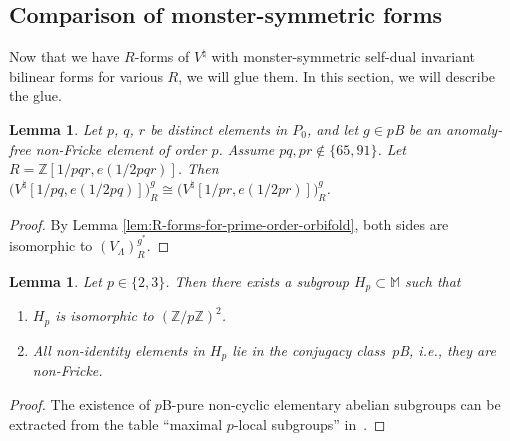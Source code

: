 \documentclass[11pt]{article}
\newcommand{\bM}{\mathbb{M}}
\newcommand{\bZ}{\mathbb{Z}}
\newtheorem{lem}[thm]{Lemma}
\theoremstyle{definition}
\begin{document}
\subsection{Comparison of monster-symmetric forms}

Now that we have $R$-forms of $V^\natural$ with monster-symmetric self-dual invariant bilinear forms for various $R$, we will glue them. In this section, we will describe the glue.

\begin{lem} \label{lem:fixed-point-comparison}Let $p$, $q$, $r$ be distinct elements in $P_0$, and let $g \in p$B be an anomaly-free non-Fricke element of order $p$. Assume $pq, pr \not\in \{65, 91\}$. Let $R = \bZ[1/pqr, e(1/2pqr)]$. Then $\big(V^\natural[1/pq,e(1/2pq)]\big)^g_R \cong \big(V^\natural[1/pr,e(1/2pr)]\big)^g_R$.
\end{lem}
\begin{proof}By Lemma \ref{lem:R-forms-for-prime-order-orbifold}, both sides are isomorphic to $(V_\Lambda)_R^{g^*}$.
\end{proof}

\begin{lem} \label{lem:affine-subgroups-of-monster}Let $p \in \{2,3\}$. Then there exists a subgroup $H_p \subset \bM$ such that
\begin{enumerate}\itemsep=0pt
\item[$1.$] $H_p$ is isomorphic to $(\bZ/p\bZ)^2$.
\item[$2.$] All non-identity elements in $H_p$ lie in the conjugacy class~$p$B, i.e., they are non-Fricke.
\end{enumerate}
\end{lem}
\begin{proof}The existence of $p$B-pure non-cyclic elementary abelian subgroups can be extracted from the table ``maximal $p$-local subgroups'' in~\cite{ATLAS}.
\end{proof}
\end{document}
